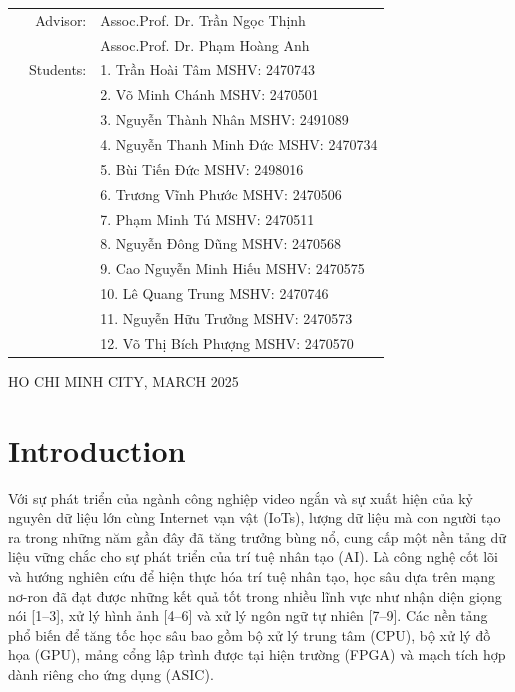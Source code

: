 \documentclass[a4paper]{article}
\begin{document}
\begin{titlepage}
\begin{table}[h]
\begin{tabular}{rrl}
\hspace{5 cm} & Advisor: & Assoc.Prof. Dr. Trần Ngọc Thịnh \\ 
&& Assoc.Prof. Dr. Phạm Hoàng Anh \\
& Students: &1. Trần Hoài Tâm MSHV: 2470743 \\
&&2. Võ Minh Chánh MSHV: 2470501 \\
&&3. Nguyễn Thành Nhân MSHV: 2491089 \\
&&4. Nguyễn Thanh Minh Đức MSHV: 2470734 \\
&&5. Bùi Tiến Đức MSHV: 2498016 \\
&&6. Trương Vĩnh Phước MSHV: 2470506 \\
&&7. Phạm Minh Tú MSHV: 2470511 \\
&&8. Nguyễn Đông Dũng MSHV: 2470568 \\
&&9. Cao Nguyễn Minh Hiếu MSHV: 2470575 \\
&&10. Lê Quang Trung MSHV: 2470746 \\
&&11. Nguyễn Hữu Trưởng MSHV: 2470573 \\
&&12. Võ Thị Bích Phượng MSHV: 2470570 \\


\end{tabular}
\end{table}

\begin{center}
{\footnotesize HO CHI MINH CITY, MARCH 2025}
\end{center}
\end{titlepage}



\newpage
\tableofcontents
\newpage

\section{Introduction}
Với sự phát triển của ngành công nghiệp video ngắn và sự xuất hiện của kỷ nguyên dữ liệu lớn cùng Internet vạn vật (IoTs), lượng dữ liệu mà con người tạo ra trong những năm gần đây đã tăng trưởng bùng nổ, cung cấp một nền tảng dữ liệu vững chắc cho sự phát triển của trí tuệ nhân tạo (AI). Là công nghệ cốt lõi và hướng nghiên cứu để hiện thực hóa trí tuệ nhân tạo, học sâu dựa trên mạng nơ-ron đã đạt được những kết quả tốt trong nhiều lĩnh vực như nhận diện giọng nói [1–3], xử lý hình ảnh [4–6] và xử lý ngôn ngữ tự nhiên [7–9]. Các nền tảng phổ biến để tăng tốc học sâu bao gồm bộ xử lý trung tâm (CPU), bộ xử lý đồ họa (GPU), mảng cổng lập trình được tại hiện trường (FPGA) và mạch tích hợp dành riêng cho ứng dụng (ASIC).
\end{document}
